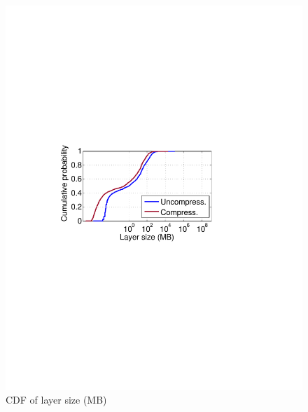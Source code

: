 \begin{figure}[t]
	\centering
	\begin{minipage}{0.22\textwidth}
		\centering
		\includegraphics[width=1\textwidth]{graphs/layer-size-cdf.pdf}
		\caption{CDF of layer size (MB)}
		\label{fig:layer-size-cdf}
	\end{minipage}%
	\begin{minipage}{0.22\textwidth}
		\centering

\end{minipage}
\end{figure}
